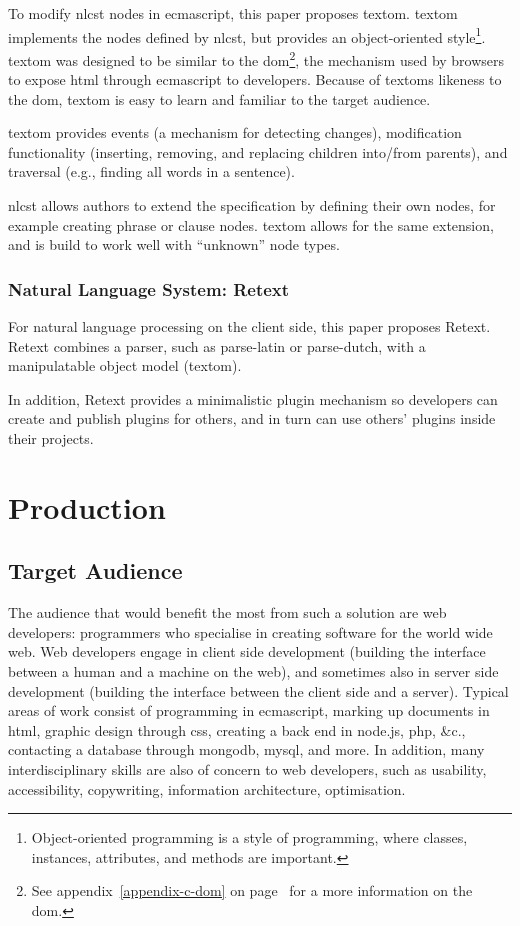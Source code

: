\begin{enumerate}
To modify \gls{nlcst} nodes in \gls{ecmascript}, this paper proposes
\gls{textom}. \gls{textom} implements the nodes defined by \gls{nlcst},
but provides an object-oriented style\footnote{Object-oriented
  programming is a style of programming, where classes, instances,
  attributes, and methods are important.}. \gls{textom} was designed to
  be similar to the \gls{dom}\footnote{See appendix~\ref{appendix-c-dom} on
  page~\pageref{appendix-c-dom} for a more
  information on the \gls{dom}.}, the mechanism used by browsers to
expose \gls{html} through \gls{ecmascript} to developers. Because of
\glspl{textom} likeness to the \gls{dom}, \gls{textom} is easy to learn
and familiar to the target audience.

\Gls{textom} provides events (a mechanism for detecting changes),
modification functionality (inserting, removing, and replacing children
into\slash from parents), and traversal (e.g., finding all words in a
sentence).

\Gls{nlcst} allows authors to extend the specification by defining their
own nodes, for example creating phrase or clause nodes. \Gls{textom}
allows for the same extension, and is build to work well with
``unknown'' node types.

\subsection{Natural Language System:
Retext}\label{natural-language-system-retext}

For natural language processing on the client side, this paper proposes
Retext. Retext combines a parser, such as parse-latin or parse-dutch,
with a manipulatable object model (\gls{textom}).

In addition, Retext provides a minimalistic plugin mechanism so
developers can create and publish plugins for others, and in turn can
use others' plugins inside their projects.

\chapter{Production}\label{production}

\section{Target Audience}\label{target-audience}

The audience that would benefit the most from such a solution are web
developers: programmers who specialise in creating software for the
world wide web. Web developers engage in client side development
(building the interface between a human and a machine on the web), and
sometimes also in server side development (building the interface
between the client side and a server). Typical areas of work consist of
programming in \gls{ecmascript}, marking up documents in \gls{html}, graphic
design through \gls{css}, creating a back end in node.js, \gls{php},
\&c., contacting a database through \gls{mongodb}, \gls{mysql}, and
more. In addition, many interdisciplinary skills are also of concern to
web developers, such as usability, accessibility, copywriting,
information architecture, optimisation.


\end{enumerate}
